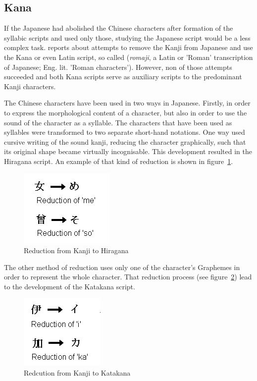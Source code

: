 \subsection{Kana }
\label{sec:kana}

If the Japanese had abolished the Chinese characters after formation of the
syllabic scripts and used only those, studying the Japanese script would be
a less complex task.  reports about attempts to remove
the Kanji from Japanese and use the Kana or even Latin script, so called
 (\emph{romaji}, a Latin or 'Roman' transcription of Japanese; 
Eng. lit. 'Roman characters'). 
However, non of those attempts succeeded and both Kana scripts serve as 
auxiliary scripts to the predominant Kanji characters. 

The Chinese characters have been used in two ways in Japanese. 
Firstly, in order to express the morphological content of a character,
but also in order to use the sound of the character as a syllable.
The characters that have been used as syllables were transformed to two 
separate short-hand notations. 
One way used cursive writing of the sound kanji, reducing the character 
graphically, such that its original shape became virtually incognisable.
This development resulted in the Hiragana script. An example of that kind of 
reduction is shown in figure~\ref{fig:reductiontohiragana}.
\begin{figure}[htbp]
\begin{center}
\includegraphics[scale=0.7]{images/reductiontohiragana.png}
\caption{Reduction from Kanji to Hiragana}
\label{fig:reductiontohiragana}
\end{center}
\end{figure}
The other method of reduction uses only one of the character's Graphemes in
order to represent the whole character. That reduction process (see 
figure~\ref{fig:reductiontokatakana}) lead to the development of the
Katakana script.
\begin{figure}[htbp] 
\begin{center}
\includegraphics[scale=0.7]{images/reductiontokatakana.png}
\caption{Redcution from Kanji to Katakana}
\label{fig:reductiontokatakana}
\end{center}
\end{figure}

